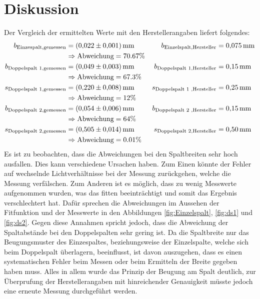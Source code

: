 \section{Diskussion}
\label{sec:Diskussion}
Der Vergleich der ermittelten Werte mit den Herstellerangaben liefert folgendes:
\begin{align*}
  b_\text{Einzespalt,gemessen} &=\SI{0.022 \pm 0.001}{\milli\metre} &   b_\text{Einzelspalt,Hersteller} &=  \SI{0.075}{\milli\metre} \\
  & \Rightarrow \text{Abweichung} = 70.67 \% \\
  b_\text{Doppelspalt 1,gemessen} &= \SI{0.049 \pm 0.003}{\milli\metre} &   b_\text{Doppelspalt 1,Hersteller} &= \SI{0.15}{\milli\metre} \\
  & \Rightarrow \text{Abweichung} = 67.3 \% \\
  s_\text{Doppelspalt 1,gemessen} &=\SI{0.220 \pm 0.008}{\milli\metre} &   s_\text{Doppelspalt 1 ,Hersteller} &= \SI{0.25}{\milli\metre} \\
  & \Rightarrow \text{Abweichung} = 12 \% \\
  b_\text{Doppelspalt 2,gemessen} &=\SI{0.054 \pm 0.006}{\milli\metre} &   b_\text{Doppelspalt 2 ,Hersteller} &= \SI{0.15}{\milli\metre} \\
  & \Rightarrow \text{Abweichung} = 64 \% \\
  s_\text{Doppelspalt 2,gemessen} &= \SI{0.505 \pm 0.014}{\milli\metre} &   s_\text{Doppelspalt 2,Hersteller} &= \SI{0.50}{\milli\metre} \\
  & \Rightarrow \text{Abweichung} = 0.01 \% \\
\end{align*}
Es ist zu beobachten, dass die Abweichungen bei den Spaltbreiten sehr hoch ausfallen.
Dies kann verschiedene Ursachen haben. Zum Einen könnte der Fehler auf wechselnde Lichtverhältnisse bei der Messung zurückgehen, welche die Messung verfälschen.
Zum Anderen ist es möglich, dass zu wenig Messwerte aufgenommen wurden, was das fitten beeinträchtigt und somit das Ergebnis verschlechtert hat. Dafür sprechen die
Abweichungen im Aussehen der Fitfunktion und der Messwerte in den Abbildungen \ref{fig:Einzelspalt}, \ref{fig:ds1} und \ref{fig:ds2}.
Gegen diese Annahmen spricht jedoch, dass die Abweichung der Spaltabstände bei den Doppelspalten sehr gering ist. Da die Spaltbreite nur das Beugungsmuster des Einzespaltes,
beziehungsweise der Einzelspalte, welche sich beim Doppelspalt überlagern, beeinflusst, ist davon auszugehen, dass es einen systematischen Fehler beim Messen oder beim Ermitteln
der Breite gegeben haben muss. Alles in allem wurde das Prinzip der Beugung am Spalt deutlich, zur Überprufung der Herstellerangaben mit hinreichender Genauigkeit müsste jedoch
eine erneute Messung durchgeführt werden. 
